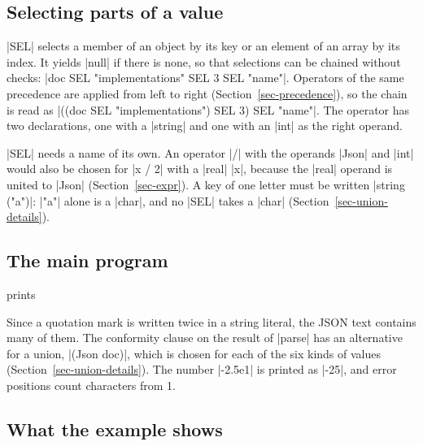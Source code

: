 \subsection*{Selecting parts of a value}


\code|SEL| selects a member of an object by its key or an element of an
array by its index. It yields \code|null| if there is none, so that
selections can be chained without checks:
\code|doc SEL "implementations" SEL 3 SEL "name"|. Operators of the same
precedence are applied from left to right (Section~\ref{sec-precedence}),
so the chain is read as
\code|((doc SEL "implementations") SEL 3) SEL "name"|. The operator has
two declarations, one with a \code|string| and one with an \code|int|
as the right operand.

\code|SEL| needs a name of its own. An operator \code|/| with the
operands \code|Json| and \code|int| would also be chosen for \code|x / 2|
with a \code|real| \code|x|, because the \code|real| operand is united
to \code|Json| (Section~\ref{sec-expr}). A key of one letter must be
written \code|string ("a")|: \code|"a"| alone is a \code|char|, and no
\code|SEL| takes a \code|char| (Section~\ref{sec-union-details}).

\subsection*{The main program}


\noindent prints

Since a quotation mark is written twice in a string literal, the JSON
text contains many of them. The conformity clause on the result of
\code|parse| has an alternative for a union, \code|(Json doc)|, which is
chosen for each of the six kinds of values
(Section~\ref{sec-union-details}). The number \code|-2.5e1| is printed
as \code|-25|, and error positions count characters from 1.

\subsection*{What the example shows}

